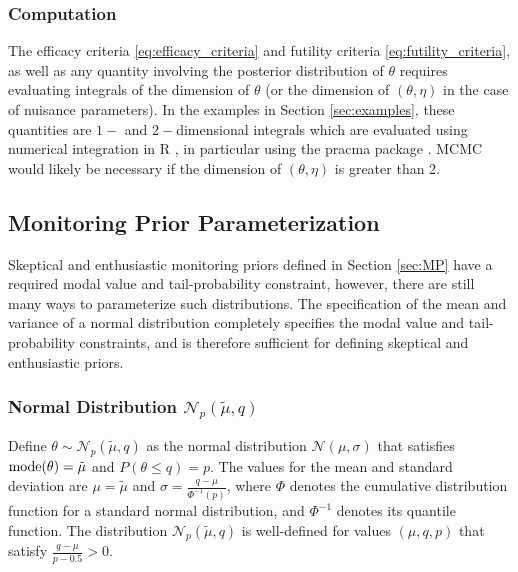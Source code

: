 \documentclass[useAMS,usenatbib,referee]{biom}
\begin{document}
\subsubsection{Computation}
The efficacy criteria \eqref{eq:efficacy_criteria} and futility criteria \eqref{eq:futility_criteria}, as well as any quantity involving the posterior distribution of $\theta$ requires evaluating integrals of the dimension of $\theta$ (or the dimension of $(\theta,\eta)$ in the case of nuisance parameters). In the examples in Section \ref{sec:examples}, these quantities are $1-$ and $2-$dimensional integrals which are evaluated using numerical integration in R \citep{R2017}, in particular using the pracma package \citep{Borchers2019}. MCMC would likely be necessary if the dimension of $(\theta,\eta)$ is greater than 2.

\subsection{Monitoring Prior Parameterization}

Skeptical and enthusiastic monitoring priors defined in Section \ref{sec:MP} have a required modal value and tail-probability constraint, however, there are still many ways to parameterize such distributions. 
%
The specification of the mean and variance of a normal distribution completely specifies the modal value and tail-probability constraints, and is therefore sufficient for defining skeptical and enthusiastic priors.

\subsubsection{Normal Distribution $\mathcal{N}_p(\tilde{\mu},q)$}

Define $\theta\sim\mathcal{N}_p(\tilde{\mu},q)$ as the normal distribution $\mathcal{N}(\mu,\sigma)$ that satisfies ${\mathrm{mode}}(\theta)=\tilde{\mu}$ and $P(\theta\leq q)=p$.
%
The values for the mean and standard deviation are $\mu=\tilde{\mu}$ and $\sigma=\frac{q-\mu}{\Phi^{-1}(p)}$, where $\Phi$ denotes the cumulative distribution function for a standard normal distribution, and $\Phi^{-1}$ denotes its quantile function. The distribution $\mathcal{N}_p(\tilde{\mu},q)$ is well-defined for values $(\mu,q,p)$ that satisfy $\frac{q-\mu}{p-0.5}>0$.
\end{document}
